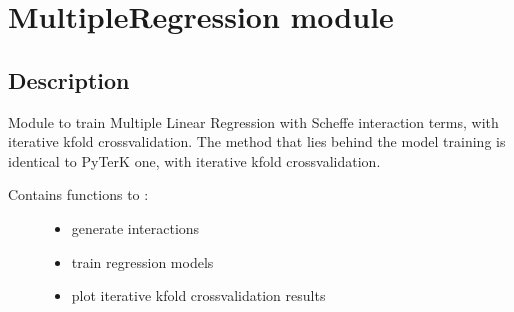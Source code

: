 \documentclass[letterpaper,10pt,english]{sphinxmanual}
\begin{document}

\begin{fulllineitems}
\label{\detokenize{PyTerK:pyterk.worker.model_fit_tensorflow}}
\end{fulllineitems}



\chapter{MultipleRegression module}
\label{\detokenize{MultipleRegression:module-MultipleRegression}}\label{\detokenize{MultipleRegression:multipleregression-module}}\label{\detokenize{MultipleRegression::doc}}

\section{Description}
\label{\detokenize{MultipleRegression:description}}
\sphinxAtStartPar
Module to train Multiple Linear Regression with Scheffe interaction terms, with iterative k\sphinxhyphen{}fold crossvalidation. The method that lies behind the model training is identical to PyTerK one, with iterative k\sphinxhyphen{}fold cross\sphinxhyphen{}validation.
\begin{description}
\item[{Contains functions to :}] \leavevmode\begin{itemize}
\item {} 
\sphinxAtStartPar
generate interactions

\item {} 
\sphinxAtStartPar
train regression models

\item {} 
\sphinxAtStartPar
plot iterative k\sphinxhyphen{}fold crossvalidation results

\end{itemize}

\end{description}
\end{document}

